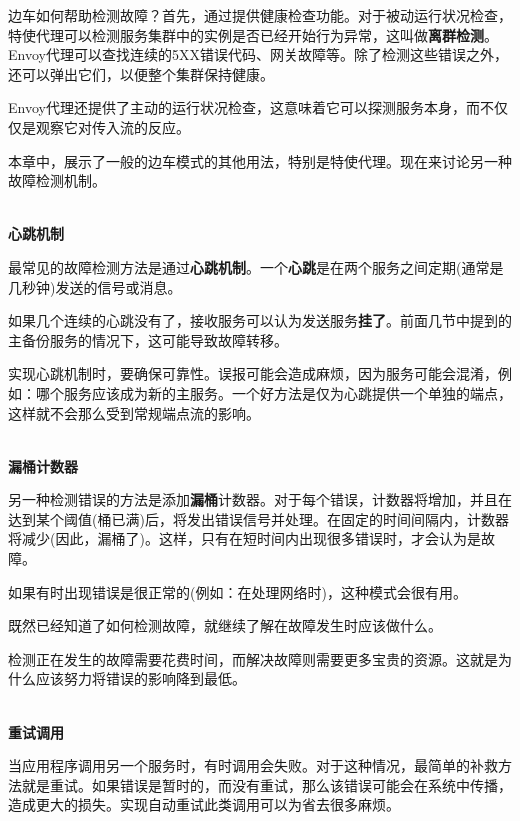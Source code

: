 边车如何帮助检测故障？首先，通过提供健康检查功能。对于被动运行状况检查，特使代理可以检测服务集群中的实例是否已经开始行为异常，这叫做\textbf{离群检测}。Envoy代理可以查找连续的5XX错误代码、网关故障等。除了检测这些错误之外，还可以弹出它们，以便整个集群保持健康。

Envoy代理还提供了主动的运行状况检查，这意味着它可以探测服务本身，而不仅仅是观察它对传入流的反应。

本章中，展示了一般的边车模式的其他用法，特别是特使代理。现在来讨论另一种故障检测机制。

\hspace*{\fill} \\ %
\noindent
\textbf{心跳机制}

最常见的故障检测方法是通过\textbf{心跳机制}。一个\textbf{心跳}是在两个服务之间定期(通常是几秒钟)发送的信号或消息。

如果几个连续的心跳没有了，接收服务可以认为发送服务\textbf{挂了}。前面几节中提到的主备份服务的情况下，这可能导致故障转移。

实现心跳机制时，要确保可靠性。误报可能会造成麻烦，因为服务可能会混淆，例如：哪个服务应该成为新的主服务。一个好方法是仅为心跳提供一个单独的端点，这样就不会那么受到常规端点流的影响。

\hspace*{\fill} \\ %
\noindent
\textbf{漏桶计数器}

另一种检测错误的方法是添加\textbf{漏桶}计数器。对于每个错误，计数器将增加，并且在达到某个阈值(桶已满)后，将发出错误信号并处理。在固定的时间间隔内，计数器将减少(因此，漏桶了)。这样，只有在短时间内出现很多错误时，才会认为是故障。

如果有时出现错误是很正常的(例如：在处理网络时)，这种模式会很有用。

既然已经知道了如何检测故障，就继续了解在故障发生时应该做什么。


检测正在发生的故障需要花费时间，而解决故障则需要更多宝贵的资源。这就是为什么应该努力将错误的影响降到最低。

\hspace*{\fill} \\ %
\noindent
\textbf{重试调用}

当应用程序调用另一个服务时，有时调用会失败。对于这种情况，最简单的补救方法就是重试。如果错误是暂时的，而没有重试，那么该错误可能会在系统中传播，造成更大的损失。实现自动重试此类调用可以为省去很多麻烦。

